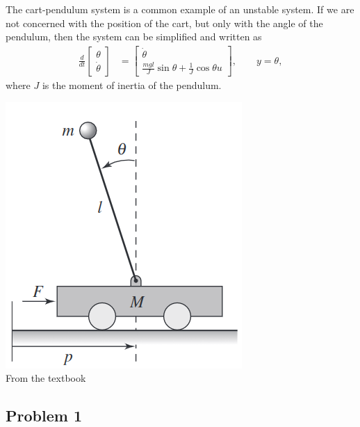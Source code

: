 \documentclass[letterpaper,12pt]{article}
\newcommand{\bbm}{\begin{bmatrix}}
\newcommand{\ebm}{\end{bmatrix}}
\begin{document}
\noindent
\begin{minipage}{0.6\linewidth}
The cart-pendulum system is a common example of an unstable system. If we are not concerned with the position of the cart, but only with the angle of the pendulum, then the system can be simplified and written as 
\begin{align}
\frac{d}{dt} \bbm \theta\\\dot{\theta} \ebm &= \bbm \dot{\theta}\\\frac{mgl}{J} \sin\theta + \frac{1}{J}\cos\theta u \ebm, \qquad y = \theta,
 \end{align}
where $J$ is the moment of inertia of the pendulum. 
\end{minipage}
\begin{minipage}{0.3\linewidth}
\begin{center}
\includegraphics[width=\linewidth]{cart-pendulum.png}\\
{\tiny From the textbook}
\end{center}
\end{minipage}

\subsection*{Problem 1}
\end{document}
